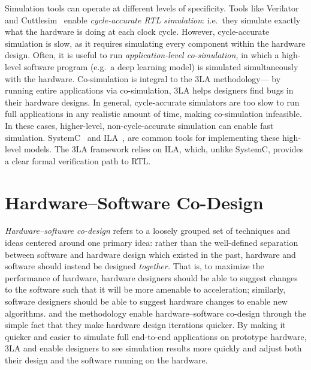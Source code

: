 Simulation tools can operate
  at different levels of specificity.
Tools like Verilator~\cite{verilator} and Cuttlesim~\cite{pitclaudel2021cuttlesim} enable \textit{cycle-accurate RTL simulation}:
  i.e.~they simulate exactly what the hardware
  is doing
  at each clock cycle.
However,
  cycle-accurate simulation is slow,
  as it requires simulating
  every component within the hardware design.
Often, it is useful to run
  \textit{application-level co-simulation,} 
  in which a high-level software program
  (e.g.~a deep learning model)
  is simulated simultaneously with the hardware.
Co-simulation is integral
  to the 3LA methodology---%
  by running entire applications
  via co-simulation, 3LA helps designers
  find bugs in their hardware designs.
In general, cycle-accurate simulators
  are too slow to run full applications
  in any realistic amount of time,
  making co-simulation infeasible.
In these cases,
  higher-level, non-cycle-accurate simulation
  can enable fast simulation.
SystemC~\cite{SystemC}
  and ILA~\cite{huang2018instruction},
  are common tools for implementing
  these high-level models.
The 3LA framework relies on ILA, which,
  unlike SystemC,
  provides
  a clear formal verification path to RTL.
  
%
  

\section{Hardware--Software Co-Design}

\textit{Hardware--software co-design}
  refers to a loosely grouped
  set of techniques and ideas
  centered around one primary idea:
  rather than the well-defined separation
  between software and hardware design
  which existed in the past,
  hardware and software
  should instead be designed \textit{together.}
That is, to maximize
  the performance of hardware,
  hardware designers should be able to suggest
  changes to the software
  such that it will be more amenable to acceleration;
  similarly,
  software designers should be able to suggest
  hardware changes
  to enable new algorithms.
\g and the 
  \TLA methodology enable
  hardware--software co-design
  through the simple fact that
  they make
  hardware design iterations quicker.
By making it quicker and easier
  to simulate full end-to-end
  applications
  on prototype hardware,
  3LA and \g enable designers
  to see simulation results more quickly
  and adjust both their design
  and the software running on the hardware.

